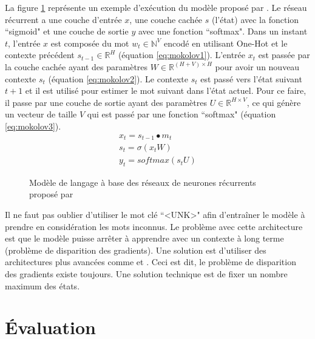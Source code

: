 \documentclass{KodeBook}
\begin{document}
La figure \ref{fig:mokolov} représente un exemple d'exécution du modèle proposé par \citet{2010-mokolov-al}.
Le réseau récurrent a une couche d'entrée $x$, une couche cachée $s$ (l'état) avec la fonction ``sigmoid" et une couche de sortie $y$ avec une fonction ``softmax".
Dans un instant $t$, l'entrée $x$ est composée du mot $w_t \in \mathbb{N}^{V}$ encodé en utilisant One-Hot et le contexte précédent $s_{t-1} \in \mathbb{R}^{H}$ (équation \ref{eq:mokolov1}). 
L'entrée $x_t$ est passée par la couche cachée ayant des paramètres $W \in \mathbb{R}^{(H+V)\times H}$ pour avoir un nouveau contexte $s_t$ (équation \ref{eq:mokolov2}). 
Le contexte $s_t$ est passé vers l'état suivant $t+1$ et il est utilisé pour estimer le mot suivant dans l'état actuel.
Pour ce faire, il passe par une couche de sortie ayant des paramètres $U \in \mathbb{R}^{H\times V}$, ce qui génère un vecteur de taille $V$ qui est passé par une fonction ``softmax" (équation \ref{eq:mokolov3}).
%
\begin{align}
	x_t = s_{t-1} \bullet m_t \label{eq:mokolov1}\\
	s_t = \sigma(x_t W) \label{eq:mokolov2}\\
	y_t = softmax(s_t U) \label{eq:mokolov3}
\end{align}

\begin{figure}[ht]
	\centering
	\caption[Modèle de langage à base des réseaux de neurones récurrents]{Modèle de langage à base des réseaux de neurones récurrents proposé par \citet{2010-mokolov-al}\label{fig:mokolov}}
\end{figure}

Il ne faut pas oublier d'utiliser le mot clé ``\textless UNK\textgreater" afin d'entraîner le modèle à prendre en considération les mots inconnus. 
Le problème avec cette architecture est que le modèle puisse arrêter à apprendre avec un contexte à long terme (problème de disparition des gradients).
Une solution est d'utiliser des architectures plus avancées comme  et . 
Ceci est dit, le problème de disparition des gradients existe toujours. 
Une solution technique est de fixer un nombre maximum des états.

\section{Évaluation}
\end{document}
